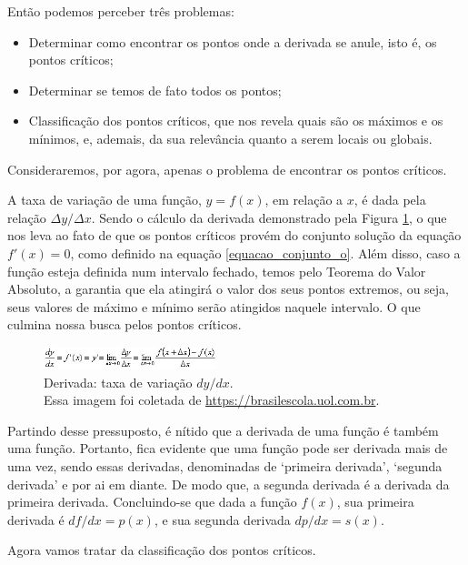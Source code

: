 Então podemos perceber três problemas:

\begin{itemize}
  \item Determinar como encontrar os pontos onde a derivada se anule, isto é, os pontos críticos;
  \item Determinar se temos de fato todos os pontos;
  \item Classificação dos pontos críticos, que nos revela quais são os máximos e
  os mínimos, e, ademais, da sua relevância quanto a serem locais ou globais.
\end{itemize}

Consideraremos, por agora, apenas o problema de encontrar os pontos críticos.


A taxa de variação de uma função, \(y=f(x)\), em relação a \(x\), é dada pela
relação \(\Delta y / \Delta x\). Sendo o cálculo da derivada
demonstrado pela Figura \ref{derivada_padrao}, o que nos leva ao fato de que
os pontos críticos provém do conjunto solução da equação \(f'(x) = 0\), como
definido na equação \ref{equacao_conjunto_o}. Além disso, caso a função esteja
definida num intervalo fechado, temos pelo Teorema do Valor Absoluto, a
garantia que ela atingirá o valor dos seus pontos extremos, ou seja, seus
valores de máximo e mínimo serão atingidos naquele intervalo. O que culmina
nossa busca pelos pontos críticos.

\begin{figure}[h]
    \includegraphics[width=0.45\textwidth]{src/derivada_padrao.jpg}
    \centering
    \caption{
      \centering
      Derivada: taxa de variação \(dy/dx\).\\
      {
        \tiny Essa imagem foi coletada de \url{https://brasilescola.uol.com.br}.
      }
    }
    \label{derivada_padrao}
\end{figure}

Partindo desse pressuposto, é nítido que a derivada de uma função é também uma
função. Portanto, fica evidente que uma função pode ser derivada
mais de uma vez, sendo essas derivadas, denominadas de `primeira derivada',
`segunda derivada' e por ai em diante. De modo que, a segunda derivada é
a derivada da primeira derivada. Concluindo-se que dada a função
\(f(x)\), sua primeira derivada é \(df/dx = p(x)\), e sua segunda derivada
\(dp/dx = s(x)\).

Agora vamos tratar da classificação dos pontos críticos.

